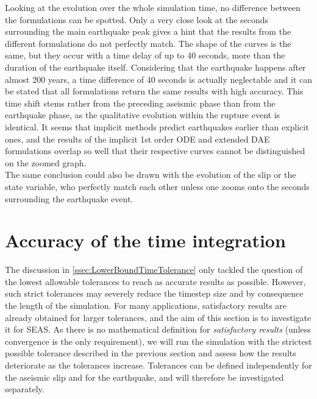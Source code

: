 Looking at the evolution over the whole simulation time, no difference between the formulations can be spotted. Only a very close look at the seconds surrounding the main earthquake peak gives a hint that the results from the different formulations do not perfectly match. The shape of the curves is the same, but they occur with a time delay of up to 40 seconds, more than the duration of the earthquake itself. Considering that the earthquake happens after almost 200 years, a time difference of 40 seconds is actually neglectable and it can be stated that all formulations return the same results with high accuracy. This time shift stems rather from the preceding aseismic phase than from the earthquake phase, as the qualitative evolution within the rupture event is identical. It seems that implicit methods predict earthquakes earlier than explicit ones, and the results of the implicit 1st order ODE and extended DAE formulations overlap so well that their respective curves cannot be distinguished on the zoomed graph.  \\
The same conclusion could also be drawn with the evolution of the slip or the state variable, who perfectly match each other unless one zooms onto the seconds surrounding the earthquake event. 


\section{Accuracy of the time integration}
\label{sec:Results_AccuracyTimeIntegration}
The discussion in \autoref{ssec:LowerBoundTimeTolerance} only tackled the question of the lowest allowable tolerances to reach as accurate results as possible. However, such strict tolerances may severely reduce the timestep size and by consequence the length of the simulation. For many applications, satisfactory results are already obtained for larger tolerances, and the aim of this section is to investigate it for SEAS. As there is no mathematical definition for \textit{satisfactory results} (unless convergence is the only requirement), we will run the simulation with the strictest possible tolerance described in the previous section and assess how the results deteriorate as the tolerances increase. Tolerances can be defined independently for the 
aseismic slip and for the earthquake, and will therefore be investigated separately. \\


